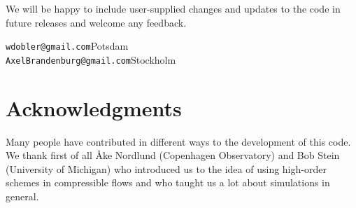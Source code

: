 \documentclass[\mydriver,12pt,twoside,notitlepage,a4paper]{article}
\newcommand{\code}[1]{\texttt{#1}}
\newcommand{\email}[1]{\code{#1}}
\begin{document}
\bigskip

We will be happy to include user-supplied changes and updates to the code
in future releases and welcome any feedback.

\vspace{5mm}
\email{wdobler@gmail.com}\hfill Potsdam\\
\email{AxelBrandenburg@gmail.com}\hfill Stockholm


\section*{Acknowledgments}

Many people have contributed in different ways to the development of this
code. We thank first of all {\AA}ke Nordlund (Copenhagen Observatory)
and Bob Stein (University of Michigan) who introduced us to the idea of
using high-order schemes in compressible flows and who taught us a lot
about simulations in general.
\end{document}
